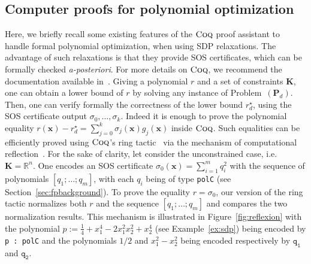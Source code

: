 \documentclass[preprint,fleqn,nocopyrightspace]{sigplanconf}
\newcommand{\code}[1]{\lstinline{#1}}
\newcommand{\R}{\mathbb{R}}
\newcommand{\x}{\mathbf{x}}
\def\P{\mathbf{P}}
\def\K{\mathbf{K}}
\newcommand{\coq}{\text{\sc Coq}}
\theoremstyle{plain}
\begin{document}
\subsection{Computer proofs for polynomial optimization}
\label{sec:coqbackground}
Here, we briefly recall some existing features of the $\coq$ proof assistant to handle formal polynomial optimization, when using SDP relaxations.
The advantage of such relaxations is that they provide SOS certificates, which can be formally checked \textit{a-posteriori}.
For more details on $\coq$, we recommend the
documentation available in~\cite{bertot2004interactive}.
Giving a polynomial $r$ and a set of constraints $\K$, one can obtain a lower bound of $r$ by solving any instance of Problem~$(\P_d)$. Then, one can verify formally the correctness of the lower bound $r_d^\star$, using the SOS certificate output $\sigma_0, \dots, \sigma_k$. Indeed it is enough to prove the polynomial equality $r(\x) - r_d^\star = \sum_{j=0}^k \sigma_j(\x) g_j(\x)$ inside $\coq$. Such equalities can be efficiently proved using $\coq$'s ring tactic~\cite{ring05} via the mechanism of computational reflection~\cite{Boutin97usingreflection}.
For the sake of clarity, let consider the unconstrained case, i.e.~$\K = \R^n$. One encodes an SOS certificate $\sigma_0(\x) = \sum_{i=1}^m q_i^2$  with the sequence of polynomials $[q_1; \dots; q_m]$, with each $q_i$ being of type \code{polC} (see Section~\ref{sec:fpbackground}). To prove the equality $r = \sigma_0$, our version of the ring tactic normalizes both $r$ and the sequence $[q_1; \dots; q_m]$ and compares the two normalization results. This mechanism is illustrated in Figure~\ref{fig:reflexion} with the polynomial $p := \frac{1}{4} + x_1^4 - 2 x_1^2 x_2^2 + x_2^4$ (see Example~\ref{ex:sdp}) being encoded by \code{p : polC}  and the polynomials $1/2$ and $x_1^2 - x_2^2$ being encoded respectively by $\mathtt{q_1}$ and $\mathtt{q_2}$. 
\end{document}
